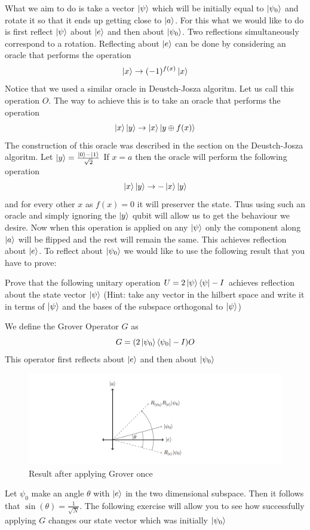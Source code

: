 What we aim to do is take a vector $\ket{\psi}$ which will be initially equal to $\ket{\psi_0}$ and rotate it so that it ends up getting close to $\ket{a}$. For this what we would like to do is first reflect $\ket{\psi}$ about $\ket{e}$ and then about $\ket{\psi_0}$. Two reflections simultaneously correspond to a rotation. Reflecting about $\ket{e}$ can be done by considering an oracle that performs the operation
$$ \ket{x} \to (-1)^{f(x)}\ket{x}$$
Notice that we used a similar oracle in Deustch-Josza algoritm. Let us call this operation $O$. The way to achieve this is to take an oracle that performs the operation
$$\ket{x}\ket{y} \to \ket{x}\ket{y \oplus f(x)}$$
The construction of this oracle was described in the section on the Deustch-Josza algoritm. Let $\ket{y} = \frac{\ket{0} - \ket{1}}{\sqrt{2}}$
If $x = a$ then the oracle will perform the following operation
$$\ket{x}\ket{y} \to -\ket{x}\ket{y}$$ and for every other $x$ as $f(x) = 0$ it will preserver the state. Thus using such an oracle and simply ignoring the $\ket{y}$ qubit will allow us to get the behaviour we desire.
Now when this operation is applied on any $\ket{\psi}$ only the component along $\ket{a}$ will be flipped and the rest will remain the same. This achieves reflection about $\ket{e}$. To reflect about $\ket{\psi_0}$ we would like to use the following result that you have to prove:
\begin{exercise}
Prove that the following unitary operation $U = 2\ket{\psi}\bra{\psi} - I$ achieves reflection about the state vector $\ket{\psi}$ (Hint: take any vector in the hilbert space and write it in terms of $\ket{\psi}$ and the bases of the subspace orthogonal to  $\ket{\psi}$)
\end{exercise}

We define the Grover Operator $G$ as $$G = (2\ket{\psi_0}\bra{\psi_0} - I)O$$ This operator first reflects about $\ket{e}$ and then about $\ket{\psi_0}$
\begin{figure}[htp]
    \caption{Result after applying Grover once}
    \centering
    \includegraphics[width=\textwidth]{grover}
\end{figure}
Let $\psi_{0}$ make an angle $\theta$ with $\ket{e}$ in the two dimensional subspace. Then it follows that $\sin(\theta) = \frac{1}{\sqrt{N}}$. The following exercise will allow you to see how successfully applying $G$ changes our state vector which was initially $\ket{\psi_0}$

